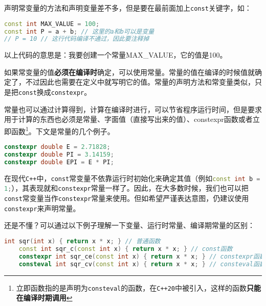 \documentclass[../main.tex]{subfiles}
\begin{document}
声明常变量的方法和声明变量差不多，但是要在最前面加上\texttt{const}关键字，如：
\begin{lstlisting}[language=C++]
const int MAX_VALUE = 100;
const int P = a + b; // 这里的a和b可以是变量
// P = 10 // 这行代码编译不通过，因此要注释掉
\end{lstlisting}
以上代码的意思是：我要创建一个常量MAX\_VALUE，它的值是100。

如果常变量的值\textbf{必须在编译时}确定，可以使用常量。常量的值在编译的时候值就确定了，不过因此也需要在定义中就写明它的值。常量的声明方法和常变量类似，只是把\texttt{const}换成\texttt{constexpr}。

常量也可以通过计算得到，计算在编译时进行，可以节省程序运行时间，但是要求用于计算的东西也必须是常量、字面值（直接写出来的值）、constexpr函数或者立即函数\footnote{立即函数指的是声明为\texttt{consteval}的函数，在\texttt{C++20}中被引入，这样的函数\textbf{只能在编译时期调用}}。下文是常量的几个例子。

\begin{lstlisting}[language=C++]
constexpr double E = 2.71828;
constexpr double PI = 3.14159;
constexpr double EPI = E * PI;
\end{lstlisting}

在现代\texttt{C++}中，\texttt{const}常变量不依靠运行时初始化来确定其值（例如\lstinline[language=c++]|const int b = 1;|），其表现就和\texttt{constexpr}常量一样了。因此，在大多数时候，我们也可以把\texttt{const}常变量当作\texttt{constexpr}常量来使用。但如希望严谨表达意图，仍建议使用\texttt{constexpr}来声明常量。

还是不懂？可以通过以下例子理解一下变量、运行时常量、编译期常量的区别：
\begin{lstlisting}[language=C++]
    int sqr(int x) { return x * x; } // 普通函数
    const int sqr_c(const int x) { return x * x; } // const函数
    constexpr int sqr_ce(const int x) { return x * x; } // constexpr函数
    consteval int sqr_cv(const int x) { return x * x; } // consteval函数
\end{lstlisting}
\end{document}
